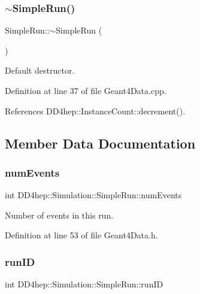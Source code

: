 \subsubsection{\texorpdfstring{$\sim$\+Simple\+Run()}{~SimpleRun()}}
{\footnotesize\ttfamily Simple\+Run\+::$\sim$\+Simple\+Run (\begin{DoxyParamCaption}{ }\end{DoxyParamCaption})\hspace{0.3cm}{\ttfamily [virtual]}}



Default destructor. 



Definition at line 37 of file Geant4\+Data.\+cpp.



References D\+D4hep\+::\+Instance\+Count\+::decrement().



\subsection{Member Data Documentation}
\hypertarget{class_d_d4hep_1_1_simulation_1_1_simple_run_a7cbde1fd06c8893176d8d7b70386281d}{}\label{class_d_d4hep_1_1_simulation_1_1_simple_run_a7cbde1fd06c8893176d8d7b70386281d} 
\subsubsection{\texorpdfstring{num\+Events}{numEvents}}
{\footnotesize\ttfamily int D\+D4hep\+::\+Simulation\+::\+Simple\+Run\+::num\+Events}



Number of events in this run. 



Definition at line 53 of file Geant4\+Data.\+h.

\hypertarget{class_d_d4hep_1_1_simulation_1_1_simple_run_a8d376fdac80fb3d671037537ca3aa858}{}\label{class_d_d4hep_1_1_simulation_1_1_simple_run_a8d376fdac80fb3d671037537ca3aa858} 
\subsubsection{\texorpdfstring{run\+ID}{runID}}
{\footnotesize\ttfamily int D\+D4hep\+::\+Simulation\+::\+Simple\+Run\+::run\+ID}



